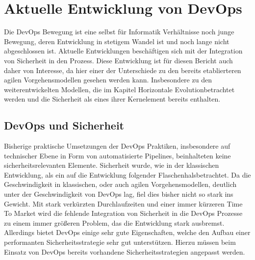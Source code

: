 \newpage
\section{Aktuelle Entwicklung von DevOps} %
Die DevOps Bewegung ist eine selbst für Informatik Verhältnisse noch junge Bewegung, deren Entwicklung in stetigem Wandel ist und noch lange nicht abgeschlossen ist. Aktuelle Entwicklungen beschäftigen sich mit der Integration von Sicherheit in den Prozess. Diese Entwicklung ist für diesen Bericht auch daher von Interesse, da hier einer der Unterschiede zu den bereits etablierteren agilen Vorgehensmodellen gesehen werden kann. Insbesondere zu den weiterentwickelten Modellen, die im Kapitel \glqq Horizontale Evolution\grqq betrachtet werden und die Sicherheit als eines ihrer Kernelement bereits enthalten.

\subsection{DevOps und Sicherheit}
Bisherige praktische Umsetzungen der DevOps Praktiken, insbesondere auf technischer Ebene in Form von automatisierte Pipelines, beinhalteten keine sicherheitsrelevanten Elemente. Sicherheit wurde, wie in der klassischen Entwicklung, als ein auf die Entwicklung folgender \glqq Flaschenhals\grqq betrachtet. Da die Geschwindigkeit in klassischen, oder auch agilen Vorgehensmodellen, deutlich unter der Geschwindigkeit von DevOps lag, fiel dies bisher nicht so stark ins Gewicht. Mit stark verkürzten Durchlaufzeiten und einer immer kürzeren Time To Market wird die fehlende Integration von Sicherheit in die DevOps Prozesse zu einem immer größeren Problem, das die Entwicklung stark ausbremst. Allerdings bietet DevOps einige sehr gute Eigenschaften, welche den Aufbau einer performanten Sicherheitsstrategie sehr gut unterstützen. Hierzu müssen beim Einsatz von DevOps bereits vorhandene Sicherheitsstrategien angepasst werden.

